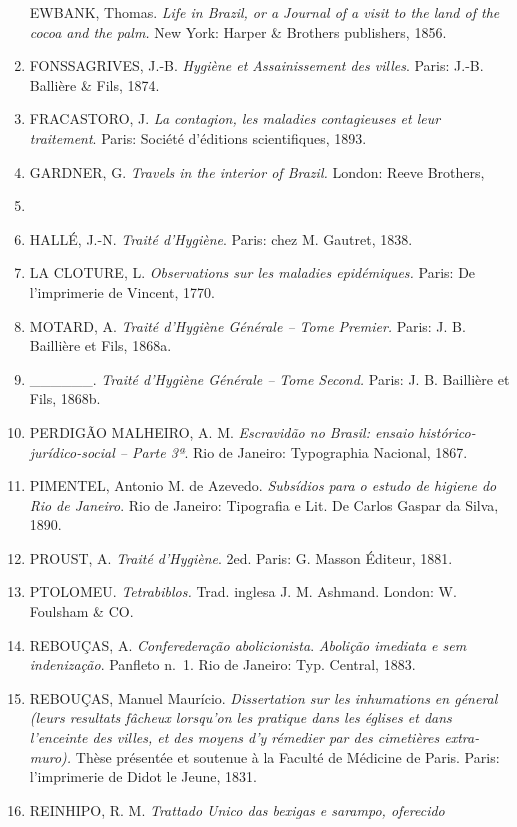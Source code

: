 \begin{enumerate}
  EWBANK, Thomas. \emph{Life in Brazil, or a Journal of a visit to the
  land of the cocoa and the palm.} New York: Harper \& Brothers
  publishers, 1856.
\item
  FONSSAGRIVES, J.-B. \emph{Hygiène et Assainissement des villes}.
  Paris: J.-B. Ballière \& Fils, 1874.
\item
  FRACASTORO, J. \emph{La contagion, les maladies contagieuses et leur
  traitement}. Paris: Société d'éditions scientifiques, 1893.
\item
  GARDNER, G. \emph{Travels in the interior of Brazil.} London: Reeve
  Brothers,
\item
\item
  HALLÉ, J.-N. \emph{Traité d'Hygiène}. Paris: chez M. Gautret, 1838.
\item
  LA CLOTURE, L. \emph{Observations sur les maladies epidémiques.}
  Paris: De l'imprimerie de Vincent, 1770.
\item
  MOTARD, A. \emph{Traité d'Hygiène Générale -- Tome Premier.} Paris: J.
  B. Baillière et Fils, 1868a.
\item
  \_\_\_\_\_\_. \emph{Traité d'Hygiène Générale -- Tome Second.} Paris:
  J. B. Baillière et Fils, 1868b.
\item
  PERDIGÃO MALHEIRO, A. M. \emph{Escravidão no Brasil: ensaio
  histórico-jurídico-social -- Parte 3ª}. Rio de Janeiro: Typographia
  Nacional, 1867.
\item
  PIMENTEL, Antonio M. de Azevedo. \emph{Subsídios para o estudo de
  higiene do Rio de Janeiro}. Rio de Janeiro: Tipografia e Lit. De
  Carlos Gaspar da Silva, 1890.
\item
  PROUST, A. \emph{Traité d'Hygiène}. 2ed. Paris: G. Masson Éditeur,
  1881.
\item
  PTOLOMEU. \emph{Tetrabiblos.} Trad. inglesa J. M. Ashmand. London: W.
  Foulsham \& CO.
\item
  REBOUÇAS, A. \emph{Conferederação abolicionista}. \emph{Abolição
  imediata e sem indenização}. Panfleto n.~1. Rio de Janeiro: Typ.
  Central, 1883.
\item
  REBOUÇAS, Manuel Maurício. \emph{Dissertation sur les inhumations en
  géneral (leurs resultats fâcheux lorsqu'on les pratique dans les
  églises et dans l'enceinte des villes, et des moyens d'y rémedier par
  des cimetières extra-muro).} Thèse présentée et soutenue à la Faculté
  de Médicine de Paris. Paris: l'imprimerie de Didot le Jeune, 1831.
\item
  REINHIPO, R. M. \emph{Trattado Unico das bexigas e sarampo, oferecido
}
\end{enumerate}
